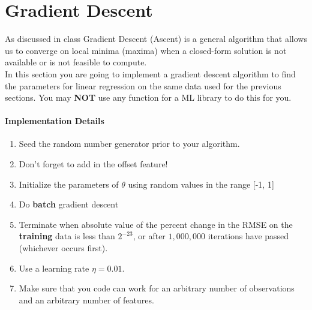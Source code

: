 \documentclass[12pt]{article}
\begin{document}
\newpage
\section{Gradient Descent}
As discussed in class Gradient Descent (Ascent) is a general algorithm that allows us to converge on local minima (maxima) when a closed-form solution is not available or is not feasible to compute.\\

\noindent
In this section you are going to implement a gradient descent algorithm to find the parameters for linear regression on the same data used for the previous sections.  You may \textbf{NOT} use any function for a ML library to do this for you.

\paragraph{Implementation Details}
\begin{enumerate}
\item Seed the random number generator prior to your algorithm.
\item Don't forget to add in the offset feature!
\item Initialize the parameters of $\theta$ using random values in the range [-1, 1]
\item Do \textbf{batch} gradient descent
\item Terminate when absolute value of the percent change in the RMSE on the \textbf{training} data is less than $2^{-23}$, or after $1,000,000$ iterations have passed (whichever occurs first).
\item Use a learning rate $\eta=0.01$.
\item Make sure that you code can work for an arbitrary number of observations and an arbitrary number of features.
\end{enumerate}
\end{document}
